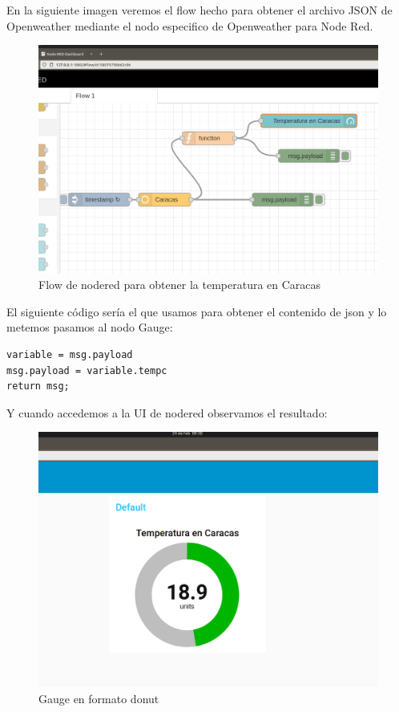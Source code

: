 \documentclass[12pt]{article}
\begin{document}
En la siguiente imagen veremos el flow hecho para obtener el archivo JSON de Openweather mediante el nodo especifico de Openweather para Node Red.

\begin{figure}[H]
    \centering
    \includegraphics[scale=0.25]{flowcaracas.png}
    \caption{Flow de nodered para obtener la temperatura en Caracas}
    \label{fig: noderedOpenweather}
\end{figure}

El siguiente código sería el que usamos para obtener el contenido de json y lo metemos pasamos al nodo Gauge:
\begin{verbatim}
variable = msg.payload
msg.payload = variable.tempc
return msg;
\end{verbatim}

Y cuando accedemos a la UI  de nodered observamos el resultado:

\begin{figure}[H]
    \centering
    \includegraphics[scale=0.25]{gauge_donut.png}
    \caption{Gauge en formato donut}
    \label{GaugeCaracas}
\end{figure}
\end{document}
